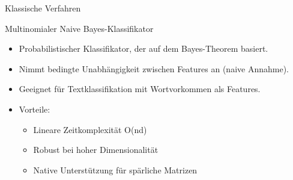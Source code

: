 \documentclass[aspectratio=169]{beamer} %
\begin{document}
\begin{frame}{Klassische Verfahren}
    \begin{block}{Multinomialer Naive Bayes-Klassifikator}
        \begin{itemize}
            \item Probabilistischer Klassifikator, der auf dem Bayes-Theorem basiert.
            \item Nimmt bedingte Unabhängigkeit zwischen Features an (naive Annahme).
            \item Geeignet für Textklassifikation mit Wortvorkommen als Features.
            \item Vorteile:
                  \begin{itemize}
                      \item Lineare Zeitkomplexität O(nd) %
                      \item Robust bei hoher Dimensionalität
                      \item Native Unterstützung für spärliche Matrizen
                  \end{itemize}
        \end{itemize}
    \end{block}
\end{frame}
\end{document}
